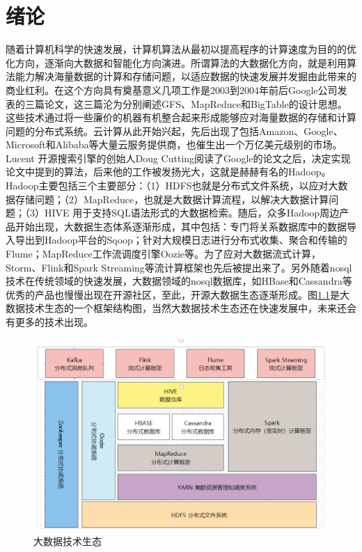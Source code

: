 \documentclass[twoside,a4paper,12pt]{book}%
\begin{document}
\chapter{绪论}
随着计算机科学的快速发展，计算机算法从最初以提高程序的计算速度为目的的优化方向，逐渐向大数据和智能化方向演进。所谓算法的大数据化方向，就是利用算法能力解决海量数据的计算和存储问题，以适应数据的快速发展并发掘由此带来的商业红利。在这个方向具有奠基意义几项工作是2003到2004年前后Google公司发表的三篇论文，这三篇沦为分别阐述GFS、MapReduce和BigTable的设计思想。这些技术通过将一些廉价的机器有机整合起来形成能够应对海量数据的存储和计算问题的分布式系统。云计算从此开始兴起，先后出现了包括Amazon、Google、Microsoft和Alibaba等大量云服务提供商，也催生出一个万亿美元级别的市场。Lucent 开源搜索引擎的创始人Doug Cutting阅读了Google的论文之后，决定实现论文中提到的算法，后来他的工作被发扬光大，这就是赫赫有名的Hadoop。Hadoop主要包括三个主要部分：（1）HDFS也就是分布式文件系统，以应对大数据存储问题；（2）MapReduce，也就是大数据计算流程，以解决大数据计算问题；（3）HIVE 用于支持SQL语法形式的大数据检索。随后，众多Hadoop周边产品开始出现，大数据生态体系逐渐形成，其中包括：专门将关系数据库中的数据导入导出到Hadoop平台的Sqoop；针对大规模日志进行分布式收集、聚合和传输的Flume；MapReduce工作流调度引擎Oozie等。为了应对大数据流式计算，Storm、Flink和Spark Streaming等流计算框架也先后被提出来了。另外随着nosql技术在传统领域的快速发展，大数据领域的nosql数据库，如HBase和Cassandra等优秀的产品也慢慢出现在开源社区，至此，开源大数据生态逐渐形成。图\ref{fig:bigdata}是大数据技术生态的一个框架结构图，当然大数据技术生态还在快速发展中，未来还会有更多的技术出现。
\begin{figure}[htbp]
	\centering
	\includegraphics[width=0.99\linewidth]{figures/bigdata.png}
	\caption{大数据技术生态}
	\label{fig:bigdata}
\end{figure}
\end{document}
